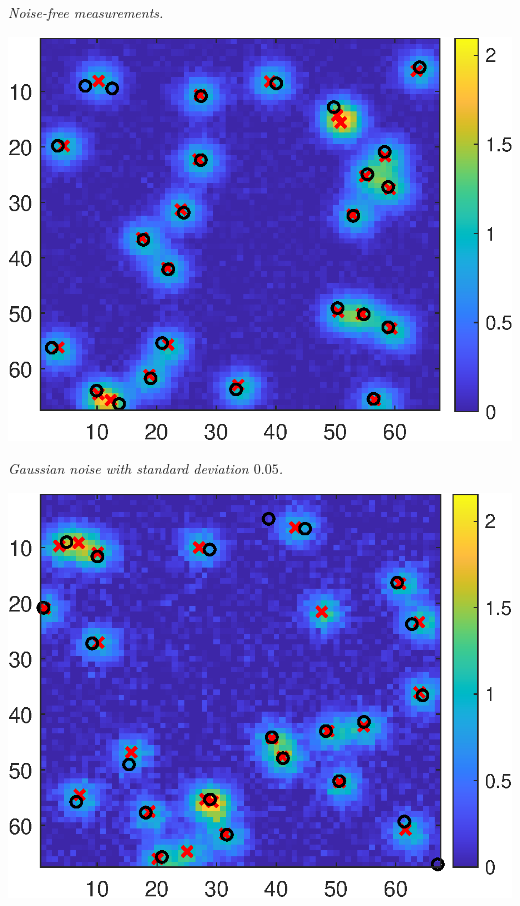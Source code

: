 \documentclass[a0paper,portrait,fontscale=0.35]{baposter}
\newcommand{\mycaption}[1]{
  {
    \smaller
    \emph{#1}
  }
}
\theoremstyle{plain}
\theoremstyle{plain}
\theoremstyle{definition}
\theoremstyle{plain}
\theoremstyle{definition}
\begin{document}
\begin{poster}
{\begin{minipage}[t]{0.48\textwidth}
\begin{minipage}[h]{\textwidth}
\begin{minipage}[t]{0.49\textwidth}
        \vspace{-0.3em}
        \mycaption{
          Noise-free measurements.
        }
      \end{minipage}
      \begin{minipage}[t]{0.49\textwidth}
        \centering
        \includegraphics[height=0.1\textheight]{img/2d_noise_005_nolegend.eps}

        \vspace{-0.3em}
        \mycaption{
          Gaussian noise with standard deviation $0.05$.
        }
      \end{minipage}

      \vspace{0.9em}
      \begin{minipage}[t]{0.49\textwidth}
        \centering
        \includegraphics[height=0.1\textheight]{img/2d_noise_01_nolegend.eps}


\end{minipage}
\end{minipage}
\end{minipage}}
\end{poster}
\end{document}
